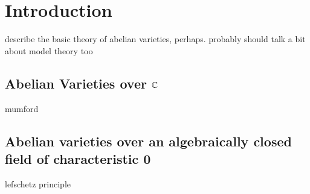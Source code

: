 \chapter{Introduction}

describe the basic theory of abelian varieties, perhaps. probably should talk a bit about model theory too

\section{Abelian Varieties over $\mathbb{C}$}

mumford

\section{Abelian varieties over an algebraically closed field of characteristic 0}
lefschetz principle